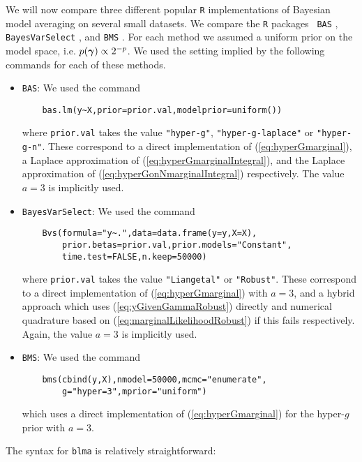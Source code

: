 We will now compare three different popular {\tt R} implementations of Bayesian
model averaging on several small datasets. We compare the {\tt R} packages {\tt
BAS} \citep{Clyde2017}, {\tt BayesVarSelect} \citep{Garcia-Donato2016}, and
{\tt BMS} \citep{Zeugner2015}. For each method we assumed a uniform prior on
the model space, i.e. $p({\boldsymbol \gamma})\propto 2^{-p}$. We used the setting implied
by the following commands for each of these methods.
\begin{itemize}
	\item {\tt BAS}: We used the command
	\begin{verbatim}
	bas.lm(y~X,prior=prior.val,modelprior=uniform())
	\end{verbatim}
	
	\noindent 
    where \verb|prior.val| takes the value \verb|"hyper-g"|,
    \verb|"hyper-g-laplace"| or \verb|"hyper-g-n"|.  These correspond to a
    direct implementation of (\ref{eq:hyperGmarginal}), a Laplace approximation
    of (\ref{eq:hyperGmarginalIntegral}), and the Laplace approximation of
    (\ref{eq:hyperGonNmarginalIntegral}) respectively. The value $a=3$ is
    implicitly used.
	
	\item {\tt BayesVarSelect}: We used the command
	\begin{verbatim}
	Bvs(formula="y~.",data=data.frame(y=y,X=X),
	    prior.betas=prior.val,prior.models="Constant",
	    time.test=FALSE,n.keep=50000)
	\end{verbatim}
	
	
    \noindent where \verb|prior.val| takes the value \verb|"Liangetal"| or
    \verb|"Robust"|.  These correspond to a direct implementation of
    (\ref{eq:hyperGmarginal}) with $a=3$, and a hybrid approach which uses
    (\ref{eq:yGivenGammaRobust}) directly and numerical quadrature based on
    (\ref{eq:marginalLikelihoodRobust}) if this fails respectively.  Again, the
    value $a=3$ is implicitly used.
	
	\item {\tt BMS}: We used the command
	\begin{verbatim}
	bms(cbind(y,X),nmodel=50000,mcmc="enumerate",
	    g="hyper=3",mprior="uniform")	
	\end{verbatim}
	
    \noindent which uses a direct implementation of (\ref{eq:hyperGmarginal})
    for the hyper-$g$ prior with $a=3$.
\end{itemize}

\noindent The syntax for {\tt blma} is relatively straightforward:

